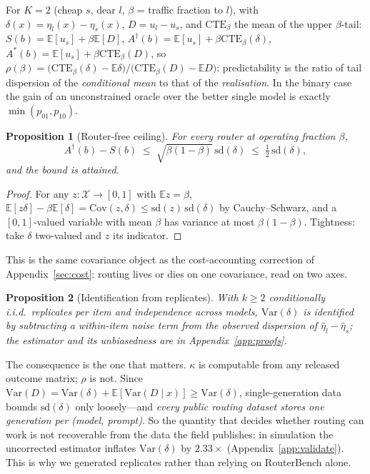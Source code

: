 \documentclass[10pt]{article}
\newtheorem{proposition}{Proposition}
\newcommand{\Sb}{S(b)}
\newcommand{\Adag}{A^{\dagger}(b)}
\newcommand{\Astar}{A^{*}(b)}
\newcommand{\E}{\mathbb{E}}
\newcommand{\Var}{\mathrm{Var}}
\newcommand{\Cov}{\mathrm{Cov}}
\newcommand{\CTE}{\mathrm{CTE}}
\begin{document}
For $K=2$ (cheap $s$, dear $l$, $\beta$ = traffic fraction to $l$), with
$\delta(x)=\eta_l(x)-\eta_s(x)$, $D=u_l-u_s$, and $\CTE_\beta$ the mean of the
upper $\beta$-tail:
$\Sb=\E[u_s]+\beta\E[D]$, $\Adag=\E[u_s]+\beta\CTE_\beta(\delta)$,
$\Astar=\E[u_s]+\beta\CTE_\beta(D)$, so
$\rho(\beta)=\bigl(\CTE_\beta(\delta)-\E\delta\bigr)/\bigl(\CTE_\beta(D)-\E D\bigr)$:
predictability is the ratio of tail dispersion of the \emph{conditional mean} to
that of the \emph{realisation}. In the binary case the gain of an unconstrained
oracle over the better single model is exactly $\min(p_{01},p_{10})$.

\begin{proposition}[Router-free ceiling]\label{prop:ceiling}
For every router at operating fraction $\beta$,
\[
\Adag-\Sb\;\le\;\sqrt{\beta(1-\beta)}\,\mathrm{sd}(\delta)\;\le\;\tfrac12\,\mathrm{sd}(\delta),
\]
and the bound is attained.
\end{proposition}
\begin{proof}
For any $z:\mathcal X\to[0,1]$ with $\E z=\beta$,
$\E[z\delta]-\beta\E[\delta]=\Cov(z,\delta)\le\mathrm{sd}(z)\,\mathrm{sd}(\delta)$
by Cauchy--Schwarz, and a $[0,1]$-valued variable with mean $\beta$ has variance
at most $\beta(1-\beta)$. Tightness: take $\delta$ two-valued and $z$ its
indicator.
\end{proof}

This is the same covariance object as the cost-accounting correction of
Appendix~\ref{sec:cost}: routing lives or dies on one covariance, read on two
axes.

\begin{proposition}[Identification from replicates]\label{prop:reps}
With $k\ge2$ conditionally i.i.d.\ replicates per item and independence across
models, $\Var(\delta)$ is identified by subtracting a within-item noise term
from the observed dispersion of $\hat\eta_l-\hat\eta_s$; the estimator and its
unbiasedness are in Appendix~\ref{app:proofs}.
\end{proposition}

The consequence is the one that matters. $\kappa$ is computable from any
released outcome matrix; $\rho$ is not. Since $\Var(D)=\Var(\delta)+\E[\Var(D\mid
x)]\ge\Var(\delta)$, single-generation data
bounds $\mathrm{sd}(\delta)$ only loosely---and \emph{every public routing
dataset stores one generation per (model, prompt)}. So the quantity that decides
whether routing can work is not recoverable from the data the field publishes:
in simulation the uncorrected estimator inflates $\Var(\delta)$ by $2.33\times$
(Appendix~\ref{app:validate}). This is why we generated replicates rather than
relying on RouterBench alone.
\end{document}
